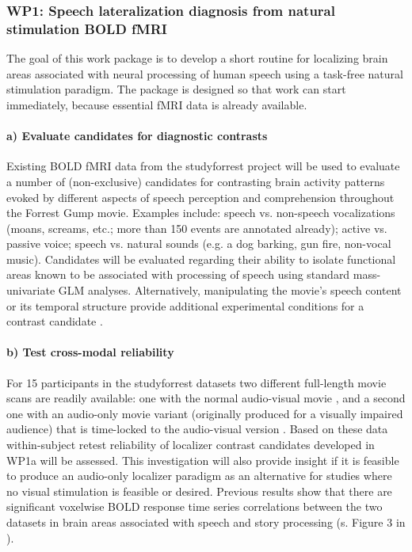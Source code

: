 \subsubsection{WP1: Speech lateralization diagnosis from
natural stimulation BOLD fMRI}

%
The goal of this work package is to develop a short routine for localizing brain
areas associated with neural processing of human speech using a task-free
natural stimulation paradigm.
%
The package is designed so that work can start immediately, because essential
fMRI data is already available.


\paragraph{a) Evaluate candidates for diagnostic contrasts}
%
Existing BOLD fMRI data from the
studyforrest project will be used to evaluate a number of (non-exclusive)
candidates for contrasting brain activity patterns evoked by different aspects
of speech perception and comprehension throughout the Forrest Gump
movie.
%
Examples include: speech vs. non-speech vocalizations (moans, screams,
etc.; more than 150 events are annotated already); active vs. passive voice;
speech vs. natural sounds (e.g. a dog barking, gun fire, non-vocal music).
%
Candidates will be evaluated regarding their ability to isolate functional areas
known to be associated with processing of speech using standard mass-univariate
GLM analyses.
%
Alternatively, manipulating the movie's speech content or its
temporal structure provide additional experimental conditions for a contrast
candidate \citep{silbert2014coupled}.


\paragraph{b) Test cross-modal reliability}

For 15 participants in the studyforrest datasets two different full-length movie
scans are readily available: one with the normal audio-visual movie
\citep{hanke2016simultaneous}, and a second one with an audio-only movie variant
(originally produced for a visually impaired audience) that is time-locked to
the audio-visual version \citep{hanke2014audiomovie}.
%
Based on these data within-subject retest reliability of localizer contrast
candidates developed in WP1a will be assessed.
%
This investigation will also
provide insight if it is feasible to produce an audio-only localizer paradigm as
an alternative for studies where no visual stimulation is feasible or desired.
%
Previous results show that there are significant voxelwise BOLD response time
series correlations between the two datasets in brain areas associated with
speech and story processing (s. Figure 3 in \citep{hanke2016simultaneous}).



